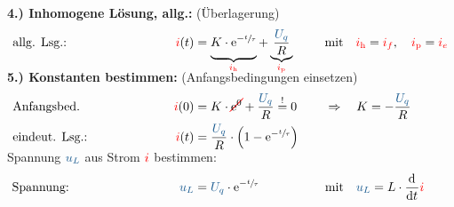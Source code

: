 {\begin{frame}
\textbf{4.) Inhomogene Lösung, allg.:} (Überlagerung)%
\begin{align*}%
    &\text{allg. Lsg.:}&&&
        \eci{i}(t) &=
        \underbrace{%
            K \cdot \mathrm{e}^{-\sfrac{t}{\tau}} \vphantom{\frac{\ecv{U_q}}{R}}%
        }_{\eci{i_{\mathrm h}}}
        +
        \underbrace{
            \frac{\ecv{U_q}}{R}
        }_{\eci{i_{\mathrm p}}} &&&
        &\text{mit}\quad \eci{i_{\mathrm h}}=\eci{i_f},\quad \eci{i_{\mathrm p}}=\eci{i_e}
    \\[-15pt]&\hphantom{R1oooooooooo}&&&\hphantom{L3ooooooooooo}&\hphantom{R3ooooooooooooooo}&&&&\hphantom{R5oooooooooooooooooo}\nonumber%
\end{align*}%
\pause%
\textbf{5.) Konstanten bestimmen:} (Anfangsbedingungen einsetzen)%
\begin{align*}%
    &\text{Anfangsbed.}&&&
        \eci{i}(0) &= K \cdot \redcancel{\mathrm{e}^0} + \frac{\ecv{U_q}}{R} \overset{!}{=} 0 &&&
        &\Rightarrow\quad K = -\frac{\ecv{U_q}}{R}\\
    &\text{eindeut. Lsg.:}&&&
        \eci{i}(t) &= \frac{\ecv{U_q}}{R} \cdot \left( 1 - \mathrm{e}^{-\sfrac{t}{\tau}} \right)
    \\[-15pt]&\hphantom{R1oooooooooo}&&&\hphantom{L3ooooooooooo}&\hphantom{R3ooooooooooooooo}&&&&\hphantom{R5oooooooooooooooooo}\nonumber%
\end{align*}%
Spannung $\ecv{u_L}$ aus Strom ${\color{red}i}$ bestimmen:%
\begin{align*}%
    &\text{Spannung:}&&&
        \ecv{u_L} &= \ecv{U_q} \cdot \mathrm{e}^{-\sfrac{t}{\tau}} &&&
        &\text{mit}\quad \ecv{u_L} = L \cdot \dt \eci{i}
    \\[-15pt]&\hphantom{R1oooooooooo}&&&\hphantom{L3ooooooooooo}&\hphantom{R3ooooooooooooooo}&&&&\hphantom{R5oooooooooooooooooo}\nonumber%
\end{align*}
\end{frame}
}%


